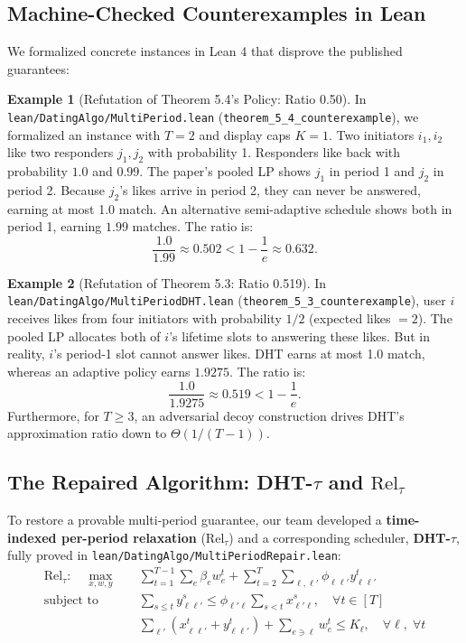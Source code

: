 \documentclass[11pt,letterpaper]{article}
\theoremstyle{definition}
\newtheorem{example}{Example}[section]
\theoremstyle{plain}
\theoremstyle{remark}
\begin{document}
\subsection{Machine-Checked Counterexamples in Lean}
We formalized concrete instances in Lean 4 that disprove the published guarantees:

\begin{example}[Refutation of Theorem 5.4's Policy: Ratio 0.50]
In \texttt{lean/DatingAlgo/MultiPeriod.lean} (\texttt{theorem\_5\_4\_counterexample}), we formalized an instance with $T=2$ and display caps $K=1$. Two initiators $i_1, i_2$ like two responders $j_1, j_2$ with probability 1. Responders like back with probability $1.0$ and $0.99$. 
The paper's pooled LP shows $j_1$ in period 1 and $j_2$ in period 2. Because $j_2$'s likes arrive in period 2, they can never be answered, earning at most 1.0 match. An alternative semi-adaptive schedule shows both in period 1, earning $1.99$ matches. The ratio is:
$$\frac{1.0}{1.99} \approx 0.502 < 1 - \frac{1}{e} \approx 0.632.$$
\end{example}

\begin{example}[Refutation of Theorem 5.3: Ratio 0.519]
In \texttt{lean/DatingAlgo/MultiPeriodDHT.lean} (\texttt{theorem\_5\_3\_counterexample}), user $i$ receives likes from four initiators with probability $1/2$ (expected likes $= 2$). The pooled LP allocates both of $i$'s lifetime slots to answering these likes. But in reality, $i$'s period-1 slot cannot answer likes. DHT earns at most 1.0 match, whereas an adaptive policy earns $1.9275$. The ratio is:
$$\frac{1.0}{1.9275} \approx 0.519 < 1 - \frac{1}{e}.$$
Furthermore, for $T \ge 3$, an adversarial decoy construction drives DHT's approximation ratio down to $\Theta(1/(T-1))$.
\end{example}

\subsection{The Repaired Algorithm: DHT-$\tau$ and $\mathrm{Rel}_\tau$}
To restore a provable multi-period guarantee, our team developed a \textbf{time-indexed per-period relaxation} ($\mathrm{Rel}_\tau$) and a corresponding scheduler, \textbf{DHT-$\tau$}, fully proved in \texttt{lean/DatingAlgo/MultiPeriodRepair.lean}:
\begin{align}
    \mathrm{Rel}_\tau: \quad \max_{x, w, y} \quad & \sum_{t=1}^{T-1} \sum_{e} \beta_e w_e^t + \sum_{t=2}^T \sum_{\ell, \ell'} \phi_{\ell\ell'} y_{\ell\ell'}^t \\
    \text{subject to} \quad & \sum_{s \le t} y_{\ell\ell'}^s \le \phi_{\ell'\ell} \sum_{s < t} x_{\ell'\ell}^s, \quad \forall t \in [T] \tag{Causal Arrival} \\
    & \sum_{\ell'} (x_{\ell\ell'}^t + y_{\ell\ell'}^t) + \sum_{e \ni \ell} w_e^t \le K_\ell, \quad \forall \ell, \; \forall t \tag{Per-Period Cap}
\end{align}
\end{document}
